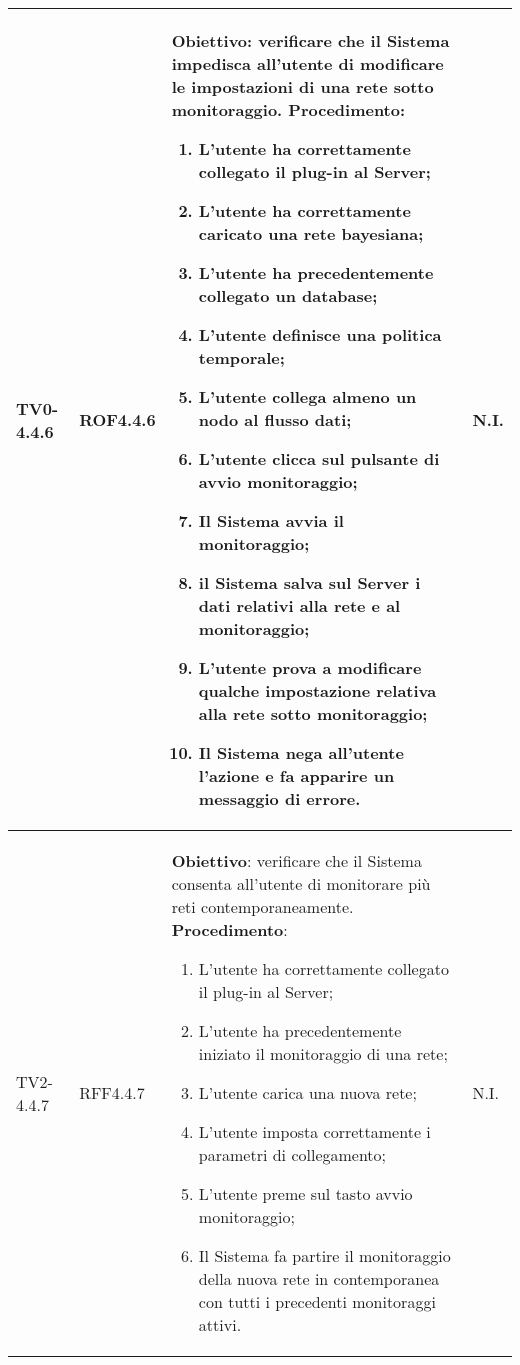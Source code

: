 \begin{longtable}{|C{.15\textwidth}|C{.13\textwidth}|m{.65\textwidth}|C{.08\textwidth}|}
TV0-4.4.6 & ROF4.4.6 &
	\textbf{Obiettivo}: verificare che il Sistema impedisca all'utente di modificare le impostazioni di una rete sotto monitoraggio. \newline
	\textbf{Procedimento}:
	\begin{enumerate}
		\item L'utente ha correttamente collegato il plug-in al Server;
		\item L'utente ha correttamente caricato una rete bayesiana;
		\item L'utente ha precedentemente collegato un database;
		\item L'utente definisce una politica temporale;
		\item L'utente collega almeno un nodo al flusso dati;
		\item L'utente clicca sul pulsante di avvio monitoraggio;							\item Il Sistema avvia il monitoraggio;
		\item il Sistema salva sul Server i dati relativi alla rete e al monitoraggio;
 		\item L'utente prova a modificare qualche impostazione relativa alla rete sotto monitoraggio;
 		\item Il Sistema nega all'utente l'azione e fa apparire un messaggio di errore.
	\end{enumerate}
	& N.I. \\
\hline

TV2-4.4.7 & RFF4.4.7 &
	\textbf{Obiettivo}: verificare che il Sistema consenta all'utente di monitorare più reti contemporaneamente. \newline
	\textbf{Procedimento}:
	\begin{enumerate}
		\item L'utente ha correttamente collegato il plug-in al Server;
		\item L'utente ha precedentemente iniziato il monitoraggio di una rete;
		\item L'utente carica una nuova rete;
		\item L'utente imposta correttamente i parametri di collegamento;
		\item L'utente preme sul tasto avvio monitoraggio;
		\item Il Sistema fa partire il monitoraggio della nuova rete in contemporanea con tutti i precedenti monitoraggi attivi.
	\end{enumerate}
	& N.I. \\
\hline


\end{longtable}
